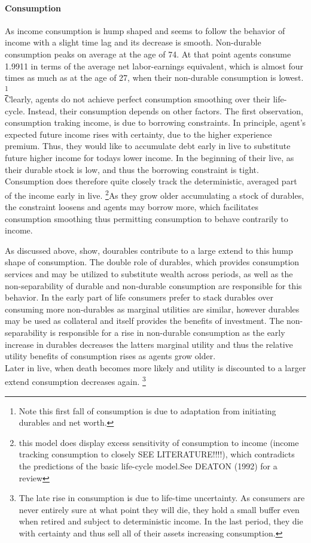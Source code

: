 \documentclass[a4paper,12pt]{article}
\begin{document}
\paragraph{Consumption} As income consumption is hump shaped and seems to follow the behavior of income with a slight time lag and its decrease is smooth. Non-durable consumption peaks on average at the age of 74. At that point agents consume 1.9911 in terms of the average net labor-earnings equivalent, which is almost four times as much as at the age of 27, when their non-durable consumption is lowest. \footnote{Note this first fall of consumption is due to adaptation from initiating durables and net worth.} \\
Clearly, agents do not achieve perfect consumption smoothing over their life-cycle. Instead, their consumption depends on other factors. The first observation, consumption traking income, is due to borrowing constraints. In principle, agent's expected future income rises with certainty, due to the higher experience premium. Thus, they would like to accumulate debt early in live to substitute future higher income for todays lower income. In the beginning of their live, as their durable stock is low, and thus the borrowing constraint is tight. Consumption does therefore quite closely track the deterministic, averaged part of the income early in live. \footnote{this model does display excess sensitivity of consumption to income (income tracking consumption to closely SEE LITERATURE!!!!), which contradicts the predictions of the 
basic life-cycle model.See DEATON (1992) for a review}As they grow older accumulating a stock of durables, the constraint loosens and agents may borrow more, which facilitates consumption smoothing thus permitting consumption to behave contrarily to income. 

As discussed above, \citep{FV&K2011} show, dourables contribute to a large extend to this hump shape of consumption. The double role of durables, which provides consumption services and may be utilized to substitute wealth across periods, as well as the non-separability of durable and non-durable consumption are responsible for this behavior. In the early part of life consumers prefer to stack durables over consuming more non-durables as marginal utilities are similar, however durables may be used as collateral and itself provides the benefits of investment. The non-separability is responsible for a rise in non-durable consumption as the early increase in durables decreases the latters marginal utility and thus the relative utility benefits of consumption rises as agents grow older. \\ Later in live, when death becomes more likely and utility is discounted to a larger extend consumption decreases again. \footnote{The late rise in consumption is due to life-time uncertainty. As consumers are never entirely sure at what point they will die, they hold a small buffer even when retired and subject to deterministic income. In the last period, they die with certainty and thus sell all of their assets increasing consumption.} 
\end{document}
